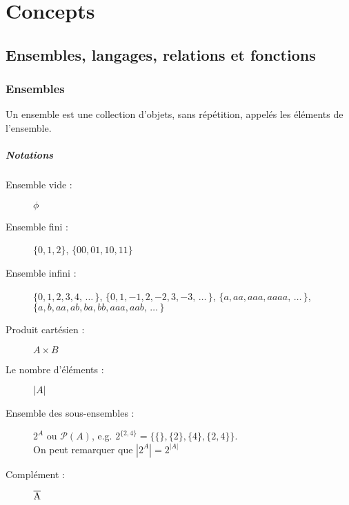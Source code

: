 
\chapter{Concepts}
\label{ch:concepts}

\section{Ensembles, langages, relations et fonctions}
\label{sec:ensembles_langages_relations_et_fonctions}

\subsection{Ensembles}
\label{subsec:ensembles}
Un ensemble est une collection d'objets, sans répétition, appelés les éléments
de l'ensemble.
\paragraph{Notations}

\begin{description}
	\item [Ensemble vide :] $\phi$
	\item [Ensemble fini :] $\{ 0, 1, 2\}$, $\{00, 01, 10, 11\}$
	\item [Ensemble infini :] $\{ 0, 1, 2, 3, 4,\, \ldots\,\}$, $\{0, 1, -1, 2, -2, 3, -3, \, \ldots\,\}$,
	\subitem $\{a, aa, aaa, aaaa,\, \ldots\,\}$, $\{a, b, aa, ab, ba, bb, aaa, aab, \, \ldots\,\}$
	\item [Produit cartésien :] $A \times B$
    \item [Le nombre d'éléments :] $\left\lvert A\right\lvert$
    \item [Ensemble des sous-ensembles :] $2^A$ ou $\mathcal{P}(A)$, e.g. $2^{\{2,4\}} = \{\{\}, \{2\}, \{4\}, \{2,4\}\}$. \\
      On peut remarquer que $|2^A| = 2^{|A|}$
	\item [Complément :] $\overline{\mathrm{A}}$
\end{description}


